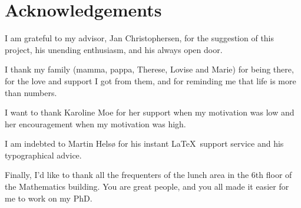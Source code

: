\chapter{Acknowledgements}


I am grateful to my advisor, Jan Christophersen, for the suggestion of this project, his unending enthusiasm, and his always open door. \newline

\noindent I thank my family (mamma, pappa, Therese, Lovise and Marie) for being there, for the love and support I got from them, and for reminding me that life is more than numbers. \newline

\noindent I want to thank Karoline Moe for her support when my motivation was low and her encouragement when my motivation was high. \newline

\noindent I am indebted to Martin Helsø for his instant \LaTeX\, support service and his typographical advice.\newline

\noindent Finally, I'd like to thank all the frequenters of the lunch area in the 6th floor of the Mathematics building. You are great people, and you all made it easier for me to work on my PhD.
